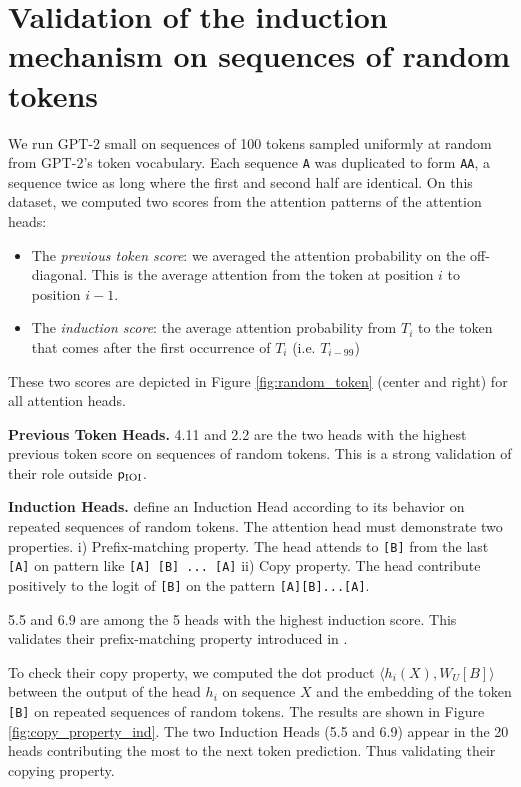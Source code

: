 \section{Validation of the induction mechanism on sequences of random tokens} \label{app:random_tok_seq}

We run GPT-2 small on sequences of 100 tokens sampled uniformly at random from GPT-2's token vocabulary. Each sequence \texttt{A} was duplicated to form \texttt{AA}, a sequence twice as long where the first and second half are identical. On this dataset, we computed two scores from the attention patterns of the attention heads:
\begin{itemize}
    \item The \emph{previous token score}: we averaged the attention probability on the off-diagonal. This is the average attention from the token at position $i$ to position $i-1$.
    \item The \emph{induction score}: the average attention probability from $T_i$ to the token that comes after the first occurrence of $T_i$ (i.e. $T_{i-99}$)
\end{itemize} 

These two scores are depicted in Figure \ref{fig:random_token} (center and right) for all attention heads. 

\textbf{Previous Token Heads.} 4.11 and 2.2 are the two heads with the highest previous token score on sequences of random tokens. This is a strong validation of their role outside $\mathsf{p}_{\mathrm{IOI}}$.

\textbf{Induction Heads.} \citet{olsson2022context} define an Induction Head according to its behavior on repeated sequences of random tokens. The attention head must demonstrate two properties. i) Prefix-matching property. The head  attends to \texttt{[B]} from the last \texttt{[A]} on pattern like \texttt{[A]\,[B]\,...\,[A]} ii) Copy property. The head contribute positively to the logit of \texttt{[B]} on the pattern \texttt{[A][B]...[A]}.

5.5 and 6.9 are among the 5 heads with the highest induction score. This validates their prefix-matching property introduced in \citet{olsson2022context}. 

To check their copy property, we computed the dot product $\langle h_i(X), W_U[B] \rangle$ between the output of the head $h_i$ on sequence $X$ and the embedding of the token \texttt{[B]} on repeated sequences of random tokens. The results are shown in Figure \ref{fig:copy_property_ind}. The two Induction Heads (5.5 and 6.9) appear in the 20 heads contributing the most to the next token prediction. Thus validating their copying property. 

